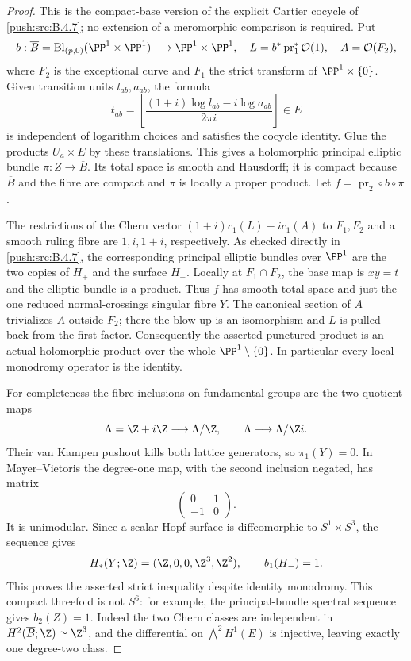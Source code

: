 \begin{proof}
This is the compact-base version of the explicit Cartier cocycle
of \ref{push:src:B.4.7}; no extension of a meromorphic comparison is required.
Put
\[
 b:\overline B=\operatorname{Bl}_{(p,0)}(\PP^1\times\PP^1)
      \longrightarrow\PP^1\times\PP^1,
 \quad L=b^*\operatorname{pr}_1^*\mathcal O(1),
 \quad A=\mathcal O(F_2),
\]
where $F_2$ is the exceptional curve and $F_1$ the strict transform
of $\PP^1\times\{0\}$.  Given transition units $l_{ab},a_{ab}$,
the formula
\[
 t_{ab}=\left[
 \frac{(1+i)\log l_{ab}-i\log a_{ab}}{2\pi i}
 \right]\in E
\]
is independent of logarithm choices and satisfies the cocycle
identity.  Glue the products $U_a\times E$ by these translations.
This gives a holomorphic principal elliptic bundle
$\pi:Z\to\overline B$.  Its total space is smooth and Hausdorff;
it is compact because $\overline B$ and the fibre are compact and
$\pi$ is locally a proper product.  Let
$f=\operatorname{pr}_2\circ b\circ\pi$.

The restrictions of the Chern vector
$(1+i)c_1(L)-i c_1(A)$ to $F_1,F_2$ and a smooth ruling fibre
are $1,i,1+i$, respectively.  As checked directly in \ref{push:src:B.4.7},
the corresponding principal elliptic bundles over $\PP^1$
are the two copies of $H_+$ and the surface $H_-$.  Locally
at $F_1\cap F_2$, the base map is $xy=t$ and the elliptic
bundle is a product.  Thus $f$ has smooth total space and just
the one reduced normal-crossings singular fibre $Y$.
The canonical section of $A$ trivializes $A$ outside $F_2$;
there the blow-up is an isomorphism and $L$ is pulled back
from the first factor.  Consequently the asserted punctured
product is an actual holomorphic product over the whole
$\PP^1\setminus\{0\}$.  In particular every local monodromy
operator is the identity.

For completeness the fibre inclusions on fundamental groups
are the two quotient maps
\[
 \Lambda=\Z+i\Z\longrightarrow\Lambda/\Z,
 \qquad
 \Lambda\longrightarrow\Lambda/\Z i.
\]
Their van Kampen pushout kills both lattice generators, so
$\pi_1(Y)=0$.  In Mayer--Vietoris the degree-one map, with
the second inclusion negated, has matrix
\[
 \begin{pmatrix}0&1\\-1&0\end{pmatrix}.
\]
It is unimodular.  Since a scalar Hopf surface is diffeomorphic
to $S^1\times S^3$, the sequence gives
\[
 H_*(Y;\Z)=(\Z,0,0,\Z^3,\Z^2),\qquad b_1(H_-)=1.
\]
This proves the asserted strict inequality despite identity
monodromy.  This compact threefold is not $S^6$: for example,
the principal-bundle spectral sequence gives $b_2(Z)=1$.
Indeed the two Chern classes are independent in
$H^2(\overline B;\Z)\simeq\Z^3$, and the differential on
$\bigwedge^2H^1(E)$ is injective, leaving exactly one
degree-two class.
\end{proof}

